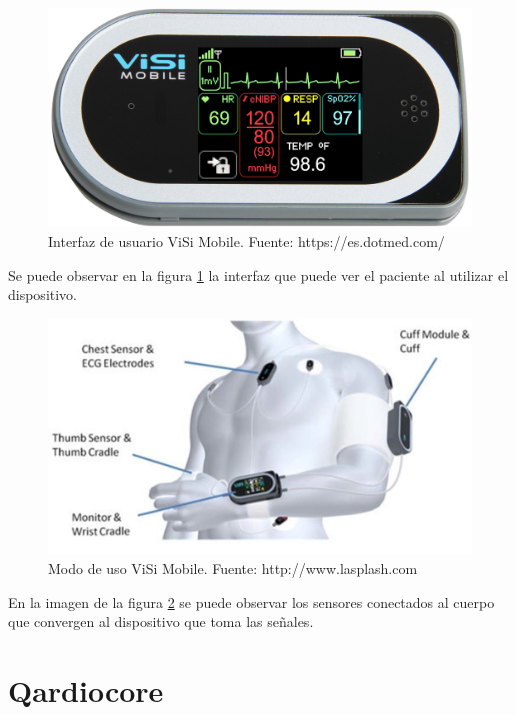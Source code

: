\begin{figure}[H]
	\centering
	\includegraphics[scale=0.3]{figuras/estadoarte/visi/visi.jpg}
	\caption{Interfaz de usuario ViSi Mobile\textregistered. Fuente: https://es.dotmed.com/}
	\label{visi1}
\end{figure}

Se puede observar en la figura \ref{visi1} la interfaz que puede ver el paciente al utilizar el dispositivo.

\begin{figure}[H]
	\centering
	\includegraphics[scale=0.7]{figuras/estadoarte/visi/wear.jpg}
	\caption{Modo de uso ViSi Mobile\textregistered. Fuente: http://www.lasplash.com}
	\label{visi2}
\end{figure}

En la imagen de la figura \ref{visi2} se puede observar los sensores conectados al cuerpo que convergen al dispositivo que toma las señales.

\section{Qardiocore\textregistered}


